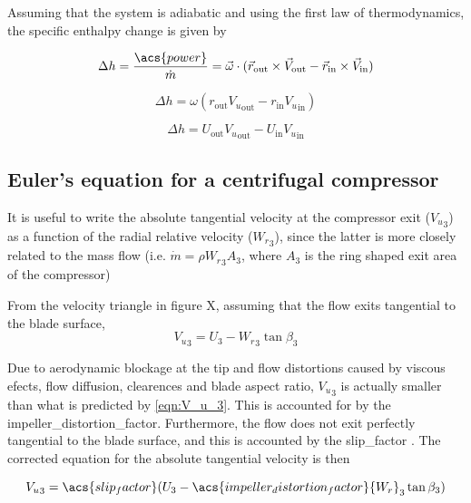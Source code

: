 \documentclass[tcc]{subfiles}
\begin{document}
Assuming that the system is adiabatic and using the first law of thermodynamics, the specific enthalpy change is given by

\begin{equation}
    \Delta h = \frac{\acs{power}}{\dot{m}} 
             = \vec{\omega} \cdot (\vec{r}_{\text{out}}\cross\vec{V}_{\text{out}} - \vec{r}_{\text{in}}\cross\vec{V}_{\text{in}}) 
\end{equation}

\begin{equation}
    \Delta h = \omega (r_{\text{out}} {V_u}_{\text{out}} - r_{\text{in}} {V_u}_{\text{in}}) 
\end{equation}

\begin{equation}
    \label{eqn:euler}
    \Delta h = U_{\text{out}} {V_u}_{\text{out}} - U_{\text{in}} {V_u}_{\text{in}} 
\end{equation}

\subsection{Euler's equation for a centrifugal compressor}

It is useful to write the absolute tangential velocity at the compressor exit (${V_u}_3$)
as a function of the radial relative velocity (${W_r}_3$),
since the latter is more closely related to the mass flow 
(i.e. $\dot{m} = \rho {W_r}_3 A_3$, where $A_3$ is the ring shaped exit area of the compressor)

From the velocity triangle in figure X, assuming that the flow exits tangential to the blade surface,
\begin{equation}
    \label{eqn:V_u_3}
    {V_u}_3 = U_3 - {W_r}_3 \tan\beta_3
\end{equation}

Due to aerodynamic blockage at the tip and flow distortions caused by viscous efects, flow diffusion, clearences and blade aspect ratio,
${V_u}_3$ is actually smaller than what is predicted by \cref{eqn:V_u_3}.
This is accounted for by the \acf{impeller_distortion_factor}.
Furthermore, the flow does not exit perfectly tangential to the blade surface, and this is accounted by the \acf{slip_factor} \cite{Wiesner1967,Aungier1995}.
The corrected equation for the absolute tangential velocity is then

\begin{equation}
    \label{eqn:V_u_3_corrected}
    {V_u}_3 = \acs{slip_factor}(U_3 - \acs{impeller_distortion_factor}{W_r}_3 \tan\beta_3)
\end{equation}
\end{document}
